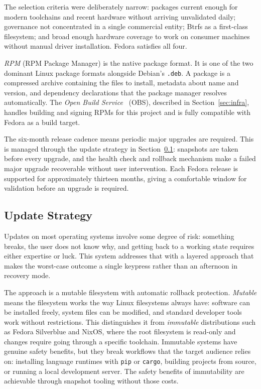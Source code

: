 The selection criteria were deliberately narrow: packages current enough for
modern toolchains and recent hardware without arriving unvalidated daily;
governance not concentrated in a single commercial entity; Btrfs as a
first-class filesystem; and broad enough hardware coverage to work on consumer
machines without manual driver installation. Fedora satisfies all four.

\emph{RPM} (RPM Package Manager) is the native package format. It is one of
the two dominant Linux package formats alongside Debian's \texttt{.deb}. A
package is a compressed archive containing the files to install, metadata about
name and version, and dependency declarations that the package manager resolves
automatically. The \emph{Open Build Service}~\cite{obs} (OBS), described in
Section~\ref{sec:infra}, handles building and signing RPMs for this project and
is fully compatible with Fedora as a build target.

The six-month release cadence means periodic major upgrades are required.
This is managed through the update strategy in Section~\ref{sec:updates}:
snapshots are taken before every upgrade, and the health check and rollback
mechanism make a failed major upgrade recoverable without user intervention.
Each Fedora release is supported for approximately thirteen months, giving a
comfortable window for validation before an upgrade is required.

\subsection{Update Strategy}
\label{sec:updates}

Updates on most operating systems involve some degree of risk: something breaks,
the user does not know why, and getting back to a working state requires either
expertise or luck. This system addresses that with a layered approach that makes
the worst-case outcome a single keypress rather than an afternoon in recovery
mode.

The approach is a mutable filesystem with automatic rollback protection.
\emph{Mutable} means the filesystem works the way Linux filesystems always have:
software can be installed freely, system files can be modified, and standard
developer tools work without restrictions. This distinguishes it from
\emph{immutable} distributions such as Fedora Silverblue and NixOS, where the
root filesystem is read-only and changes require going through a specific
toolchain. Immutable systems have genuine safety benefits, but they break
workflows that the target audience relies on: installing language runtimes with
\texttt{pip} or \texttt{cargo}, building projects from source, or running a
local development server. The safety benefits of immutability are achievable
through snapshot tooling without those costs.

